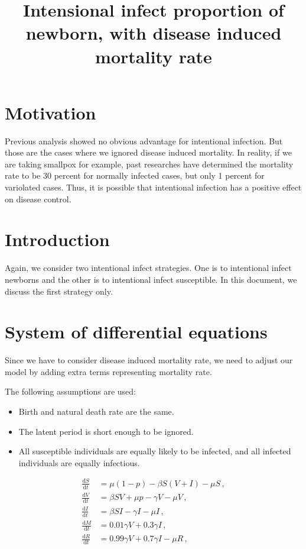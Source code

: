 \documentclass[12pt]{article}
\title{Intensional infect proportion of newborn, with disease induced mortality rate}
\newcommand\dbyd[2]{\frac{\mathrm d{#1}}{\mathrm d{#2}}}
\begin{document}
\linenumbers
\maketitle

\section{Motivation}

Previous analysis showed no obvious advantage for intentional infection. But those are the cases where we ignored disease induced mortality. In reality, if we are taking smallpox for example, past researches have determined the mortality rate to be 30 percent for normally infected cases, but only 1 percent for variolated cases. Thus, it is possible that intentional infection has a positive effect on disease control.

\section{Introduction}

Again, we consider two intentional infect strategies. One is to intentional infect newborns and the other is to intentional infect susceptible. In this document, we discuss the first strategy only.

\section{System of differential equations}
Since we have to consider disease induced mortality rate, we need to adjust our model by adding extra terms representing mortality rate.

The following assumptions are used:

\begin{itemize}
\item Birth and natural death rate are the same.
\item The latent period is short enough to be ignored.
\item All susceptible individuals are equally likely to be infected, and all infected individuals are equally infectious.
\end{itemize}

\begin{equation}\label{1}
\begin{split}
\dbyd{S}{t}&=\mu(1-p)- \beta S(V+I)-\mu S \,,\\
\dbyd{V}{t}&=\beta SV+\mu p-\gamma V -\mu V\,,\\
\dbyd{I}{t}&=\beta SI-\gamma I -\mu I\,,\\
\dbyd{M}{t}&=0.01\gamma V+0.3\gamma I\,,\\
\dbyd{R}{t}&=0.99\gamma V+0.7\gamma I-\mu R\,,
\end{split}
\end{equation}
\end{document}
